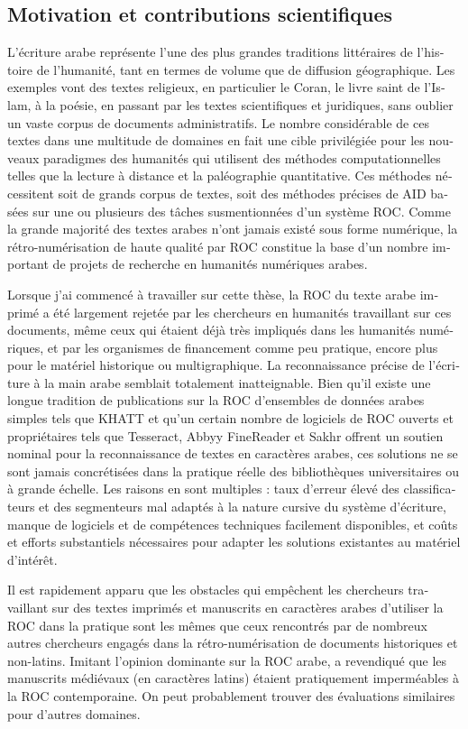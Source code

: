 \begin{french}
\section{Motivation et contributions scientifiques}

L'écriture arabe représente l'une des plus grandes traditions littéraires de
l'histoire de l'humanité, tant en termes de volume que de diffusion
géographique. Les exemples vont des textes religieux, en particulier le Coran,
le livre saint de l'Islam, à la poésie, en passant par les textes scientifiques
et juridiques, sans oublier un vaste corpus de documents administratifs. Le
nombre considérable de ces textes dans une multitude de domaines en fait une
cible privilégiée pour les nouveaux paradigmes des humanités qui utilisent des
méthodes computationnelles telles que la lecture à distance et la paléographie
quantitative. Ces méthodes nécessitent soit de grands corpus de textes, soit
des méthodes précises de AID basées sur une ou plusieurs des tâches
susmentionnées d'un système ROC. Comme la grande majorité des textes arabes
n'ont jamais existé sous forme numérique, la rétro-numérisation de haute
qualité par ROC constitue la base d'un nombre important de projets de recherche
en humanités numériques arabes.

Lorsque j'ai commencé à travailler sur cette thèse, la ROC du texte arabe
imprimé a été largement rejetée par les chercheurs en humanités 
travaillant sur ces documents, même ceux qui étaient déjà très impliqués dans
les humanités numériques, et par les organismes de financement comme
peu pratique, encore plus pour le matériel historique ou multigraphique. La
reconnaissance précise de l'écriture à la main arabe semblait totalement
inatteignable. Bien qu'il existe une longue tradition de publications sur la
ROC d'ensembles de données arabes simples tels que KHATT\cite{mahmoud2014khatt}
et qu'un certain nombre de logiciels de ROC ouverts et propriétaires tels que
Tesseract, Abbyy FineReader et Sakhr offrent un soutien nominal pour la
reconnaissance de textes en caractères arabes, ces solutions ne se sont jamais
concrétisées dans la pratique réelle des bibliothèques universitaires ou à
grande échelle. Les raisons en sont multiples : taux d'erreur élevé des
classificateurs et des segmenteurs mal adaptés à la nature cursive du système
d'écriture, manque de logiciels et de compétences techniques facilement
disponibles, et coûts et efforts substantiels nécessaires pour adapter les
solutions existantes au matériel d'intérêt.

Il est rapidement apparu que les obstacles qui empêchent les chercheurs
travaillant sur des textes imprimés et manuscrits en caractères arabes
d'utiliser la ROC dans la pratique sont les mêmes que ceux rencontrés par de
nombreux autres chercheurs engagés dans la rétro-numérisation de documents
historiques et non-latins. Imitant l'opinion dominante sur la ROC arabe,
\cite{widner2017toward} a revendiqué que les manuscrits médiévaux (en
caractères latins) étaient pratiquement imperméables à la ROC contemporaine. On
peut probablement trouver des évaluations similaires pour d'autres domaines.


\end{french}
